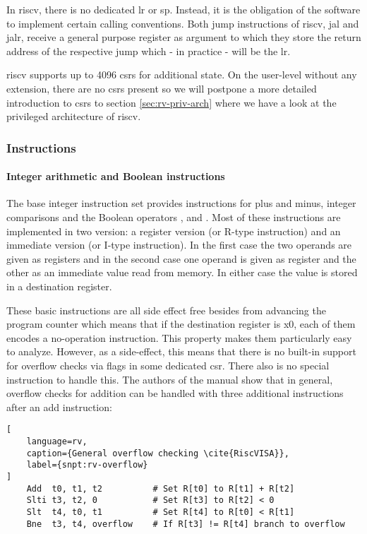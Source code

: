 In \gls{riscv}, there is no dedicated \gls{lr} or \gls{sp}.
Instead, it is the obligation of the software to implement certain calling conventions.
Both jump instructions of \gls{riscv}, \gls{jal} and \gls{jalr}, receive a general purpose register as argument to which they store the return address of the respective jump which - in practice - will be the \gls{lr}.

\gls{riscv} supports up to 4096 \glspl{csr} for additional state.
On the user-level without any extension, there are no \glspl{csr} present so we will postpone a more detailed introduction to \glspl{csr} to section \ref{sec:rv-priv-arch} where we have a look at the privileged architecture of \gls{riscv}.

\subsubsection{Instructions}

\paragraph{Integer arithmetic and Boolean instructions}
The base integer instruction set provides instructions for plus and minus, integer comparisons and the Boolean operators ,  and .
Most of these instructions are implemented in two version: a register version (or R-type instruction) and an immediate version (or I-type instruction).
In the first case the two operands are given as registers and in the second case one operand is given as register and the other as an immediate value read from memory.
In either case the value is stored in a destination register.

These basic instructions are all side effect free besides from advancing the program counter which means that if the destination register is x0, each of them encodes a no-operation instruction.
This property makes them particularly easy to analyze.
However, as a side-effect, this means that there is no built-in support for overflow checks via flags in some dedicated \gls{csr}.
There also is no special instruction to handle this.
The authors of the manual show that in general, overflow checks for addition can be handled with three additional instructions after an add instruction:

\begin{lstlisting}[
    language=rv,
    caption={General overflow checking \cite{RiscVISA}},
    label={snpt:rv-overflow}
]
    Add  t0, t1, t2          # Set R[t0] to R[t1] + R[t2]
    Slti t3, t2, 0           # Set R[t3] to R[t2] < 0
    Slt  t4, t0, t1          # Set R[t4] to R[t0] < R[t1]
    Bne  t3, t4, overflow    # If R[t3] != R[t4] branch to overflow
\end{lstlisting}

